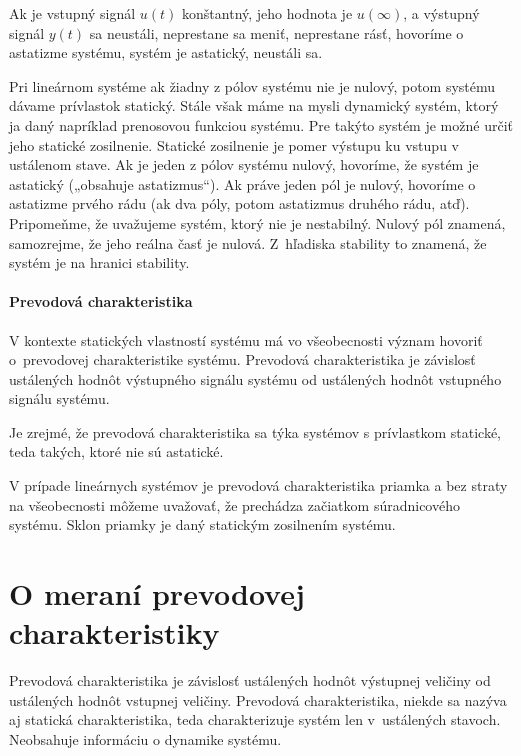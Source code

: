 \documentclass[a4paper, 10pt, ]{article}
\begin{document}
Ak je vstupný signál $u(t)$ konštantný, jeho hodnota je $u(\infty)$, a výstupný signál $y(t)$ sa neustáli, neprestane sa meniť, neprestane rásť, hovoríme o astatizme systému, systém je astatický, neustáli sa.


\smallskip

Pri lineárnom systéme ak žiadny z pólov systému nie je nulový, potom systému dávame prívlastok statický. Stále však máme na mysli dynamický systém, ktorý ja daný napríklad prenosovou funkciou systému. Pre takýto systém je možné určiť jeho statické zosilnenie. Statické zosilnenie je pomer výstupu ku vstupu v ustálenom stave. Ak je jeden z pólov systému nulový, hovoríme, že systém je astatický („obsahuje astatizmus“). Ak práve jeden pól je nulový, hovoríme o astatizme prvého rádu (ak dva póly, potom astatizmus druhého rádu, atď). Pripomeňme, že uvažujeme systém, ktorý nie je nestabilný. Nulový pól znamená, samozrejme, že jeho reálna časť je nulová. Z~hľadiska stability to znamená, že systém je na hranici stability.


\paragraph{Prevodová charakteristika}

V kontexte statických vlastností systému má vo všeobecnosti význam hovoriť o~prevodovej charakteristike systému. Prevodová charakteristika je závislosť ustálených hodnôt výstupného signálu systému od ustálených hodnôt vstupného signálu systému.

Je zrejmé, že prevodová charakteristika sa týka systémov s prívlastkom statické, teda takých, ktoré nie sú astatické.

\smallskip

V prípade lineárnych systémov je prevodová charakteristika priamka a bez straty na všeobecnosti môžeme uvažovať, že prechádza začiatkom súradnicového systému. Sklon priamky je daný statickým zosilnením systému.







\section{O meraní prevodovej charakteristiky}


Prevodová charakteristika je závislosť ustálených hodnôt výstupnej veličiny od ustálených hodnôt vstupnej veličiny. Prevodová charakteristika, niekde sa nazýva aj statická charakteristika, teda charakterizuje systém len v~ustálených stavoch. Neobsahuje informáciu o dynamike systému.
\end{document}
